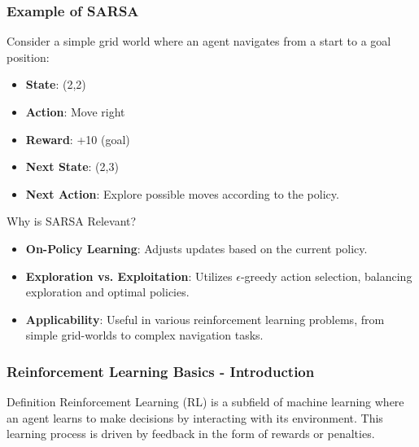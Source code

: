 \documentclass{beamer}
\begin{document}
\begin{frame}[fragile]
    \frametitle{Example of SARSA}
    Consider a simple grid world where an agent navigates from a start to a goal position:
    \begin{itemize}
        \item \textbf{State}: (2,2)
        \item \textbf{Action}: Move right
        \item \textbf{Reward}: +10 (goal)
        \item \textbf{Next State}: (2,3)
        \item \textbf{Next Action}: Explore possible moves according to the policy.
    \end{itemize}

    \begin{block}{Why is SARSA Relevant?}
        \begin{itemize}
            \item \textbf{On-Policy Learning}: Adjusts updates based on the current policy.
            \item \textbf{Exploration vs. Exploitation}: Utilizes $\epsilon$-greedy action selection, balancing exploration and optimal policies.
            \item \textbf{Applicability}: Useful in various reinforcement learning problems, from simple grid-worlds to complex navigation tasks.
        \end{itemize}
    \end{block}
\end{frame}

\begin{frame}[fragile]
    \frametitle{Reinforcement Learning Basics - Introduction}
    \begin{block}{Definition}
        Reinforcement Learning (RL) is a subfield of machine learning where an agent learns to make decisions by interacting with its environment. This learning process is driven by feedback in the form of rewards or penalties.
    \end{block}
\end{frame}
\end{document}
